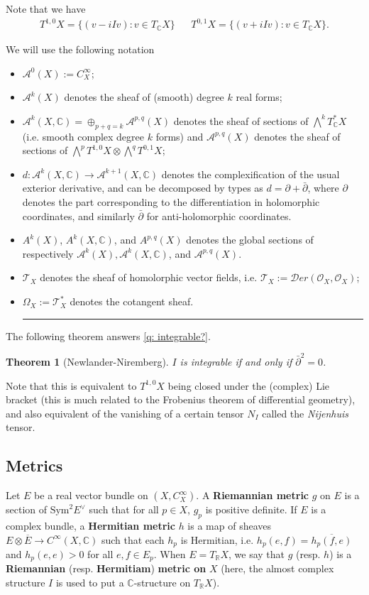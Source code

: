 \documentclass[11pt]{amsart}
\newcommand{\cA}{\mathcal{A}}
\newcommand{\cD}{\mathcal{D}}
\newcommand{\cO}{\mathcal{O}}
\newcommand{\cT}{\mathcal{T}}
\newcommand{\tbf}[1]{\textbf{#1}}
\newcommand{\R}{\mathbb R}
\newcommand{\C}{\mathbb C}
\newif\ifqedbarused
\newcommand{\qedbar}{%
  \unskip\nobreak\hfill %
  \hspace{1em} %
  \rule{3em}{0.4pt} %
}
\newcommand{\qedbarhere}{%
  \qedbar%
  \global\qedbarusedtrue%
}
\newtheorem{theorem}{Theorem}[subsection]
\theoremstyle{definition}
\numberwithin{equation}{section}
\begin{document}
Note that we have
\begin{align*}
	T^{1,0}X=\{(v-iIv):v\in T_\C X\}&&T^{0,1}X=\{(v+iIv):v\in T_\C X\}.
\end{align*}
\begin{notation}
	We will use the following notation
	\begin{itemize}
		\item $\cA^0(X):=C^\infty_X$;
		\item $\cA^k(X)$ denotes the sheaf of (smooth) degree $k$ real forms;
		\item $\cA^k(X,\C)=\oplus_{p+q=k}\cA^{p,q}(X)$ denotes the sheaf of sections of $\bigwedge^kT_\C^*X$ (i.e. smooth complex degree $k$ forms) and $\cA^{p,q}(X)$ denotes the sheaf of sections of $\bigwedge^pT^{1,0}X\otimes \bigwedge^q T^{0,1}X$;
		\item $d:\cA^k(X,\C)\to \cA^{k+1}(X,\C)$ denotes the complexification of the usual exterior derivative, and can be decomposed by types as $d=\partial+\bar\partial$, where $\partial$ denotes the part corresponding to the differentiation in holomorphic coordinates, and similarly $\bar\partial$ for anti-holomorphic coordinates.
		\item $A^k(X)$, $A^k(X,\C)$, and $A^{p,q}(X)$ denotes the global sections of respectively $\cA^k(X),\cA^k(X,\C)$, and $\cA^{p,q}(X)$.\
		\item $\cT_X$ denotes the sheaf of homolorphic vector fields, i.e. $\cT_X:=\cD er(\cO_X,\cO_X)$;
		\item $\Omega_X:=\cT_X^*$ denotes the cotangent sheaf.\qedbarhere
		\end{itemize}
\end{notation}
The following theorem answers \autoref{q: integrable?}.
\begin{theorem}[Newlander-Niremberg]
	$I$ is integrable if and only if $\bar{\partial}^2=0$.
\end{theorem}
Note that this is equivalent to $T^{1,0}X$ being closed under the (complex) Lie bracket (this is much related to the Frobenius theorem of differential geometry), and also equivalent of the vanishing of a certain tensor $N_I$ called the \emph{Nijenhuis} tensor. 
\subsection{Metrics}
Let $E$ be a real vector bundle on $(X,C_X^\infty)$. A \tbf{Riemannian metric} $g$ on $E$ is a section of $\text{Sym}^2E^\vee$ such that for all $p\in X$, $g_p$ is positive definite. If $E$ is a complex bundle, a \tbf{Hermitian metric} $h$ is a map of sheaves $E\otimes \overline E\to C^\infty(X,\C)$ such that each $h_p$ is Hermitian, i.e. $h_p(e,f)=\overline{h_p(f,e)}$ and $h_p(e,e)>0$ for all $e,f\in E_p$.  When $E=T_\R X$, we say that $g$ (resp. $h$) is a \tbf{Riemannian} (resp. \tbf{Hermitiam}) \tbf{metric on } $X$ (here, the almost complex structure $I$ is used to put a $\C$-structure on $T_\R X$).
\end{document}
